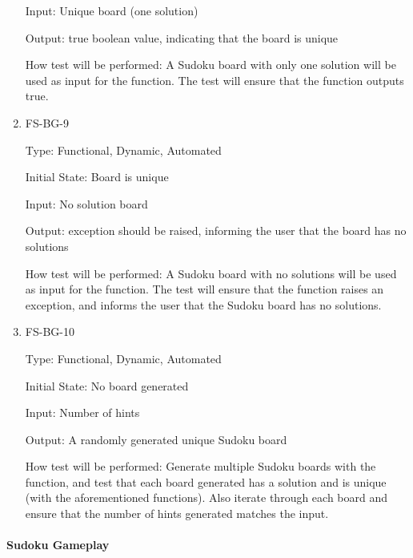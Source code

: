 \documentclass[11pt]{article}
\begin{document}
\begin{enumerate}
Input: Unique board (one solution)
					
Output: true boolean value, indicating that the board is unique
					
How test will be performed: A Sudoku board with only one solution will be used as input for the function. The test will ensure that the function outputs true.

\item{FS-BG-9\\}

Type: Functional, Dynamic, Automated
					
Initial State: Board is unique
					
Input: No solution board
					
Output: exception should be raised, informing the user that the board has no solutions
					
How test will be performed: A Sudoku board with no solutions will be used as input for the function. The test will ensure that the function raises an exception, and informs the user that the Sudoku board has no solutions.

\item{FS-BG-10\\}

Type: Functional, Dynamic, Automated
					
Initial State: No board generated
					
Input: Number of hints
					
Output: A randomly generated unique Sudoku board
					
How test will be performed: Generate multiple Sudoku boards with the function, and test that each board generated has a solution and is unique (with the aforementioned functions). Also iterate through each board and ensure that the number of hints generated matches the input. 

\end{enumerate}

\paragraph{Sudoku Gameplay}
\end{document}
